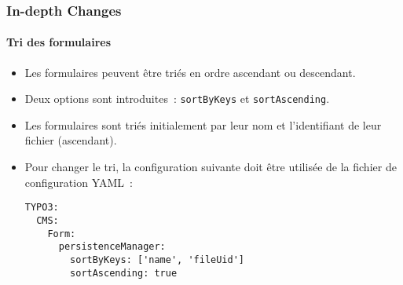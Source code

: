 \begin{frame}[fragile]
	\frametitle{In-depth Changes}
	\framesubtitle{Tri des formulaires}

	\lstset{basicstyle=\tiny\ttfamily}

	\begin{itemize}
		\item Les formulaires peuvent être triés en ordre ascendant ou descendant.
		\item Deux options sont introduites~: \texttt{sortByKeys} et \texttt{sortAscending}.
		\item Les formulaires sont triés initialement par leur nom et l'identifiant de leur fichier (ascendant).
		\item Pour changer le tri, la configuration suivante doit être utilisée de la fichier de configuration YAML~:
\begin{lstlisting}
TYPO3:
  CMS:
    Form:
      persistenceManager:
        sortByKeys: ['name', 'fileUid']
        sortAscending: true
\end{lstlisting}

	\end{itemize}

\end{frame}


